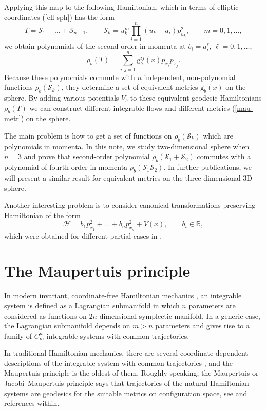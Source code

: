 \documentclass[pdftex]{sigma}
\numberwithin{equation}{section}
\begin{document}
Applying this map to the following Hamiltonian, which in terms of elliptic coordinates (\ref{ell-sph}) has the form
\[
T=\mathcal S_1+\dots+\mathcal S_{n-1} ,\qquad \mathcal S_k=u_k^m\prod_{i=1}^n (u_k-a_i)p_{u_k}^2 ,\qquad m=0,1,\dots ,
\]
we obtain polynomials of the second order in momenta at $b_i=a_i^\ell$, $\ell=0,1,\dots$,
\[\rho_b(T)=\sum_{i,j=1}^n \mathrm g^{ij}_b(x) p_{x_i} p_{x_j} .\]
Because these polynomials commute with $n$ independent, non-polynomial functions $\rho_b(\mathcal S_k)$, they determine a set of equivalent metrics $\mathrm g_b(x)$ on the sphere. By adding various potentials $V_b$ to these equivalent geodesic Hamiltonians $\rho_b(T)$ we can construct different integrable flows and different metrics (\ref{mau-metr}) on the sphere.

 The main problem is how to get a set of functions on $\rho_b(\mathcal S_k)$ which are polynomials in momenta. In this note, we study two-dimensional sphere when $n=3$ and prove that second-order polynomial $\rho_b(\mathcal S_1+\mathcal S_2)$ commutes with a polynomial of fourth order in momenta $\rho_b(\mathcal S_1\mathcal S_2)$. In further publications, we will present a similar result for equivalent metrics on the three-dimensional 3D sphere.

 Another interesting problem is to consider canonical transformations preserving Hamiltonian of the form
 \[
\mathcal H=b_1p_{x_1}^2+\dots+ b_np_{x_n}^2+V(x) ,\qquad b_i\in\mathbb R ,
\]
which were obtained for different partial cases in \cite{ts15,ts15a,ts17ell,ts17v, ts17c}.

\appendix

\section{The Maupertuis principle}
 In modern invariant, coordinate-free Hamiltonian mechanics \cite{arn,kup77}, an integrable system is defined as a Lagrangian submanifold in which $n$ parameters are considered as functions on $2n$-dimensional symplectic manifold. In a generic case, the Lagrangian submanifold depends on $m>n$ parameters and gives rise to a family of $C^n_m$ integrable systems with common trajectories.

 In traditional Hamiltonian mechanics, there are several coordinate-dependent descriptions of the integrable system with common trajectories \cite{bl12}, and the Maupertuis principle is the oldest of them. Roughly speaking, the Maupertuis or Jacobi--Maupertuis principle says that trajectories of the natural Hamiltonian systems are geodesics for the suitable metrics on configuration space, see \cite{bf05,bol95,ts99, ts01} and references within.
\end{document}
